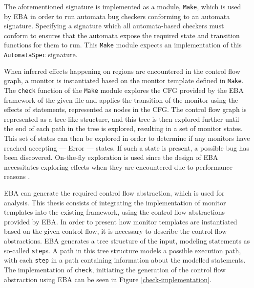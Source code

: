 \newpar The aforementioned signature is implemented as a module, \texttt{Make}, which is used by EBA in order to run automata bug checkers conforming to an automata signature. Specifying a signature which all automata-based checkers must conform to ensures that the automata expose the required state and transition functions for them to run. This \texttt{Make} module expects an implementation of this \texttt{AutomataSpec} signature. 

\newpar When inferred effects happening on regions are encountered in the control flow graph, a monitor is instantiated based on the monitor template defined in \texttt{Make}. The \texttt{check} function of the \texttt{Make} module explores the CFG provided by the EBA framework of the given file and applies the transition of the monitor using the effects of statements, represented as nodes in the CFG. The control flow graph is represented as a tree-like structure, and this tree is then explored further until the end of each path in the tree is explored, resulting in a set of monitor states. This set of states can then be explored in order to determine if any monitors have reached accepting --- Error --- states. If such a state is present, a possible bug has been discovered. On-the-fly exploration is used since the design of EBA necessitates exploring effects when they are encountered due to performance reasons \cite{Abal2017EffectiveBF}. 

\newpar EBA can generate the required control flow abstraction, which is used for analysis. This thesis consists of integrating the implementation of monitor templates into the existing framework, using the control flow abstractions provided by EBA. In order to present how monitor templates are instantiated based on the given control flow, it is necessary to describe the control flow abstractions. EBA generates a tree structure of the input, modeling statements as so-called \texttt{step}s. A path in this tree structure models a possible execution path, with each \texttt{step} in a path containing information about the modelled statements. The implementation of \texttt{check}, initiating the generation of the control flow abstraction using EBA can be seen in Figure \ref{check-implementation}. 

